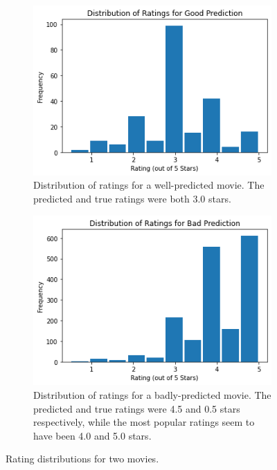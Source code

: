 \documentclass[letterpaper, 10 pt, conference]{ieeeconf}  %
\begin{document}
\begin{figure}[h]
   \begin{subfigure}[b]{\columnwidth}
      \includegraphics[width=\linewidth]{./figs/gooddist.png}
      \caption{Distribution of ratings for a well-predicted movie. The predicted and true ratings were both 3.0 stars.}
   \end{subfigure}
   \hfill
   \begin{subfigure}[b]{\columnwidth}
      \includegraphics[width=\linewidth]{./figs/baddist.png}
      \caption{Distribution of ratings for a badly-predicted movie. The predicted and true ratings were 4.5 and 0.5 stars respectively, while the most popular ratings seem to have been 4.0 and 5.0 stars.}
   \end{subfigure}
   \caption{Rating distributions for two movies.}
\end{figure}
\end{document}
